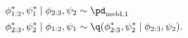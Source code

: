 \begin{align}
  \phi_{1:2}^{*}, \psi_{1}^{*} \mid \phi_{2:3}, \psi_{2} &\sim \pd_{\text{meld}, 1} \\
  \phi_{2:3}^{*}, \psi_{2}^{*} \mid \phi_{1:2}, \psi_{1} &\sim \q(\phi_{2:3}^{*}, \psi_{2}^{*} \mid \phi_{2:3}, \psi_{2}).
  \label{eqn:stage-two-gibbs-updates}
\end{align}